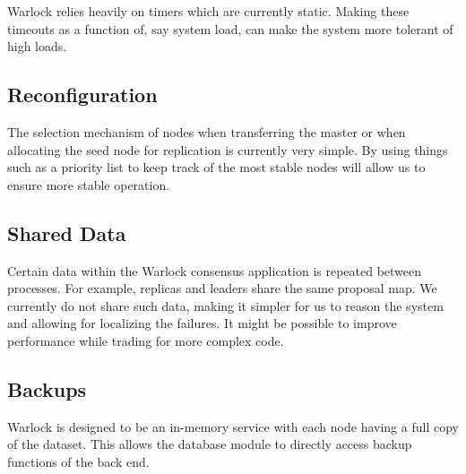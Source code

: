 Warlock relies heavily on timers which are currently static. Making these
timeouts as a function of, say system load, can make the system more tolerant
of high loads.

\subsection{Reconfiguration}

The selection mechanism of nodes when transferring the master or when
allocating the seed node for replication is currently very simple.
By using things such as a priority list to keep track of the most stable
nodes will allow us to ensure more stable operation.

\subsection{Shared Data}

Certain data within the Warlock consensus application is repeated between
processes. For example, replicas and leaders share the same proposal map.
We currently do not share such data, making it simpler for us
to reason the system and allowing for localizing the failures. It might
be possible to improve performance while trading for more complex code.

\subsection{Backups}

Warlock is designed to be an in-memory service with each node having a full copy
of the dataset. This allows the database module to directly access
backup functions of the back end.

